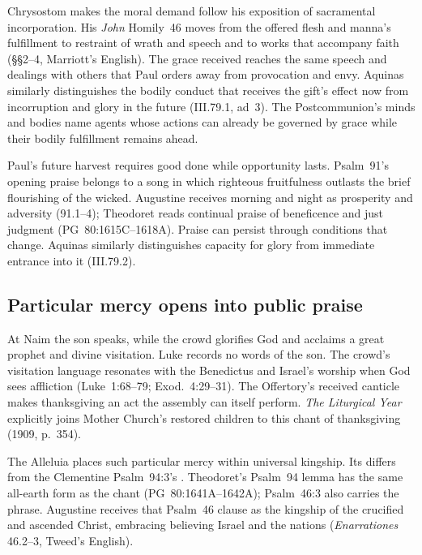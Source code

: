 Chrysostom makes the moral demand follow his exposition of sacramental
incorporation. His \emph{John} Homily~46 moves from the offered flesh and
manna's fulfillment to restraint of wrath and speech and to works that
accompany faith (§§2--4, Marriott's English). The grace received reaches
the same speech and dealings with others that Paul orders away from
provocation and envy. Aquinas similarly distinguishes the bodily conduct
that receives the gift's effect now from incorruption and glory in the
future (III.79.1, ad~3). The Postcommunion's minds and bodies name agents
whose actions can already be governed by grace while their bodily
fulfillment remains ahead.

Paul's future harvest requires good done while opportunity lasts.
Psalm~91's opening praise belongs to a song in which righteous fruitfulness
outlasts the brief flourishing of the wicked. Augustine receives morning
and night as prosperity and adversity (91.1--4); Theodoret reads continual
praise of beneficence and just judgment (PG~80:1615C--1618A). Praise can
persist through conditions that change. Aquinas similarly distinguishes
capacity for glory from immediate entrance into it (III.79.2).

\subsection*{Particular mercy opens into public praise\enspace{}}

At Naim the son speaks, while the crowd glorifies God and acclaims a great
prophet and divine visitation. Luke records no words of the son. The
crowd's visitation language resonates with the Benedictus and Israel's
worship when God sees affliction (Luke~1:68--79; Exod.~4:29--31).
The Offertory's received canticle makes thanksgiving an act the assembly
can itself perform. \emph{The Liturgical Year} explicitly joins Mother
Church's restored children to this chant of thanksgiving (1909, p.~354).

The Alleluia places such particular mercy within universal kingship.
Its  differs from the Clementine Psalm~94:3's
. Theodoret's Psalm~94 lemma has the same all-earth
form as the chant (PG~80:1641A--1642A); Psalm~46:3 also carries the phrase.
Augustine receives that Psalm~46 clause as the kingship of the crucified
and ascended Christ, embracing believing Israel and the nations
(\emph{Enarrationes} 46.2--3, Tweed's English).


